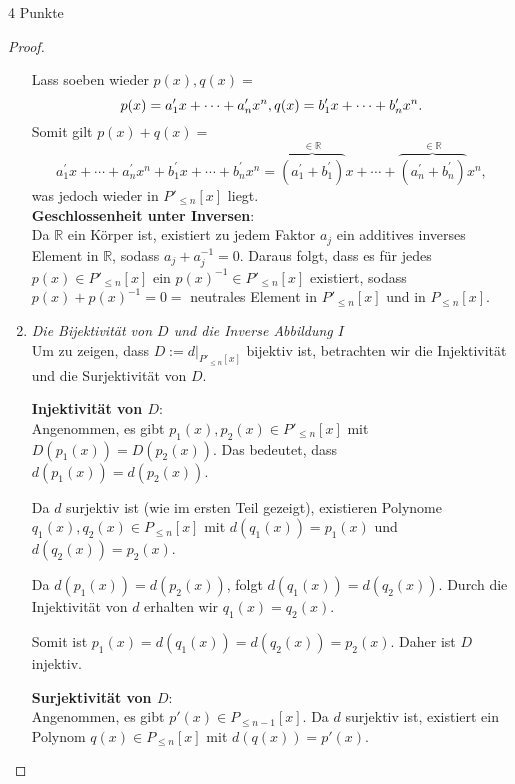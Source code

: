 \documentclass{problemset}
\begin{document}
\begin{problem}{4 Punkte}
\begin{proof}
\begin{enumerate}
              Lass soeben wieder $p(x), q(x) =$ \[
                  p(x) = a^\prime_1 x + \cdots + a^\prime_n x^n, \\
                  q(x) = b^\prime_1 x + \cdots + b^\prime_n x^n.
              \]
              Somit gilt $p(x) + q(x) =$ \[
                  a^\prime_1 x + \cdots + a^\prime_nx^n + b^\prime_1x + \cdots + b^\prime_nx^n =
                  \overbrace{(a^\prime_1+b^\prime_1)}^{\in \mathbb{R}}x + \cdots + \overbrace{(a^\prime_n+b^\prime_n)}^{\in \mathbb{R}}x^n,
              \] was jedoch wieder in $P'_{\le n}[x]$ liegt. \checkmark \\
              \textbf{Geschlossenheit unter Inversen}: \\ Da $\mathbb{R}$ ein Körper ist,
              existiert zu jedem Faktor $a_j$ ein additives inverses Element in $\mathbb{R}$,
              sodass $a_j + a_j^{-1} = 0$. Daraus folgt, dass es für jedes $p(x) \in P'_{\le
                  n}[x]$ ein $p(x)^{-1} \in P'_{\le n}[x]$ existiert, sodass $p(x) + p(x)^{-1} =
                  0 =$ neutrales Element in $P'_{\le n}[x]$ und in $P_{\le n}[x]$. \checkmark
        \item \textit{Die Bijektivität von $D$ und die Inverse Abbildung $I$} \\
              Um zu zeigen, dass $D := d|_{P'_{\le n}[x]}$ bijektiv ist, betrachten wir die Injektivität und die Surjektivität von $D$.

              \textbf{Injektivität von $D$}: \\
              Angenommen, es gibt $p_1(x), p_2(x) \in P'_{\le n}[x]$ mit $D(p_1(x)) = D(p_2(x))$. Das bedeutet, dass $d(p_1(x)) = d(p_2(x))$.

              Da $d$ surjektiv ist (wie im ersten Teil gezeigt), existieren Polynome $q_1(x),
                  q_2(x) \in P_{\le n}[x]$ mit $d(q_1(x)) = p_1(x)$ und $d(q_2(x)) = p_2(x)$.

              Da $d(p_1(x)) = d(p_2(x))$, folgt $d(q_1(x)) = d(q_2(x))$. Durch die
              Injektivität von $d$ erhalten wir $q_1(x) = q_2(x)$.

              Somit ist $p_1(x) = d(q_1(x)) = d(q_2(x)) = p_2(x)$. Daher ist $D$ injektiv.
              \checkmark

              \textbf{Surjektivität von $D$}: \\
              Angenommen, es gibt $p'(x) \in P_{\le n-1}[x]$. Da $d$ surjektiv ist, existiert ein Polynom $q(x) \in P_{\le n}[x]$ mit $d(q(x)) = p'(x)$.


\end{enumerate}
\end{proof}
\end{problem}
\end{document}
